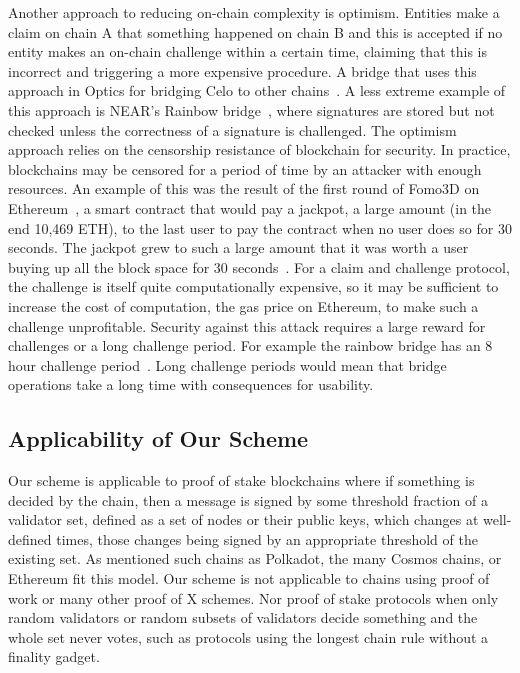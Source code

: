 \noindent Another approach to reducing on-chain complexity is optimism. Entities make a claim on chain A that something happened on chain B and this is accepted if no entity makes an on-chain challenge within a certain time, claiming that this is incorrect and triggering a more expensive procedure. A bridge that uses this approach in Optics for bridging Celo to other chains~\cite{CeloOptics}. A less extreme example of this approach is NEAR's Rainbow bridge~\cite{NEARrainbowB}, where signatures are stored but not checked unless the correctness of a signature is challenged. The optimism approach relies on the censorship resistance of blockchain for security. In practice, blockchains may be censored for a period of time by an attacker with enough resources. An example of this was the result of the first round of Fomo3D on Ethereum~\cite{Fomo3DPM}, a smart contract that would pay a jackpot, a large amount (in the end 10,469 ETH), to the last user to pay the contract when no user does so for 30 seconds. The jackpot grew to such a large amount that it was worth a user buying up all the block space for 30 seconds~\cite{Fomo3DPM}. For a claim and challenge protocol, the challenge is itself quite computationally expensive, so it may be sufficient to increase the cost of computation, the gas price on Ethereum, to make such a challenge unprofitable. Security against this attack requires a large reward for challenges or a long challenge period. For example the rainbow bridge has an 8 hour challenge period~\cite{RainbowBridgeFAQ}. Long challenge periods would mean that bridge operations take a long time with consequences for usability.
\vspace{-0.08in}
\subsection{Applicability of Our Scheme}

\noindent Our scheme is applicable to proof of stake blockchains where if something is decided by the chain, then a message is signed by some threshold fraction of a validator set, defined as a set of nodes or their public keys, which changes at well-defined times, those changes being signed by an appropriate threshold of the existing set. As mentioned such chains as Polkadot, the many Cosmos chains, or Ethereum fit this model. Our scheme is not applicable to chains using proof of work or many other proof of X schemes. Nor proof of stake protocols when only random validators or random subsets of validators decide something and the whole set never votes, such as protocols using the longest chain rule without a finality gadget.

